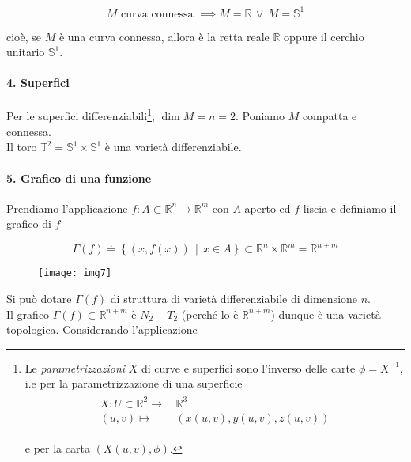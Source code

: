 \begin{theorem}
	\begin{equation}
		M \text{ curva connessa } \implies M = \mathbb{R} \, \lor \, M = \mathbb{S}^{1}
	\end{equation}

	cioè, se $ M $ è una curva connessa, allora è la retta reale $ \mathbb{R} $ oppure il cerchio unitario $ \mathbb{S}^{1} $.
\end{theorem}

\paragraph{4. Superfici}

Per le superfici differenziabili\footnote{%
	Le \textit{parametrizzazioni} $ X $ di curve e superfici sono l'inverso delle carte $ \phi = X^{-1} $, i.e per la parametrizzazione di una superficie
	\begin{align}
		\begin{split}
			X : U \subset \mathbb{R}^{2} \to& \, \mathbb{R}^{3}\\
			(u,v) \mapsto& \, (x(u,v),y(u,v),z(u,v))
		\end{split}
	\end{align}

	e per la carta $ (X(u,v),\phi) $.%
}, $ \dim M = n = 2 $. Poniamo $ M $ compatta e connessa.\\
Il toro $ \mathbb{T}^{2} = \mathbb{S}^{1} \times \mathbb{S}^{1} $ è una varietà differenziabile.

\paragraph{5. Grafico di una funzione}

Prendiamo l'applicazione $ f : A \subset \mathbb{R}^{n} \to \mathbb{R}^{m} $ con $ A $ aperto ed $ f $ liscia e definiamo il grafico di $ f $

\begin{equation}
	\Gamma(f) \doteq \left\{ (x,f(x)) \, \middle| \, x \in A \right\} \subset \mathbb{R}^{n} \times \mathbb{R}^{m} = \mathbb{R}^{n+m}
\end{equation}

\begin{figure}[H]
	\centering
	\texttt{[image: img7]}
\end{figure}

Si può dotare $ \Gamma(f) $ di struttura di varietà differenziabile di dimensione $ n $.\\
Il grafico $ \Gamma(f) \subset \mathbb{R}^{n+m} $ è $ N_{2}+T_{2} $ (perché lo è $ \mathbb{R}^{n+m} $) dunque è una varietà topologica. Considerando l'applicazione

